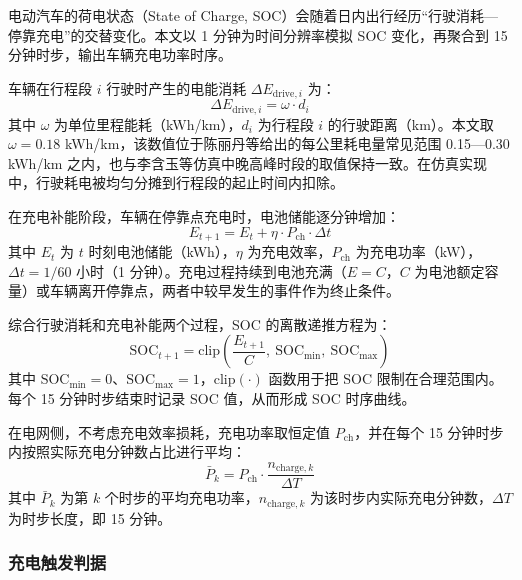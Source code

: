\documentclass[10pt,a4paper]{article}
\numberwithin{equation}{section}
\numberwithin{table}{section}
\numberwithin{figure}{section}
\begin{document}
    电动汽车的荷电状态（State of Charge, SOC）会随着日内出行经历“行驶消耗—停靠充电”的交替变化。本文以 1 分钟为时间分辨率模拟 SOC 变化，再聚合到 15 分钟时步，输出车辆充电功率时序。

    车辆在行程段 $i$ 行驶时产生的电能消耗 $\Delta E_{\text{drive},i}$ 为：
    \begin{equation}
    \label{eq:energy_drive}
    \Delta E_{\text{drive},i} = \omega \cdot d_i
    \end{equation}
    其中 $\omega$ 为单位里程能耗（kWh/km），$d_i$ 为行程段 $i$ 的行驶距离（km）。本文取 $\omega = 0.18$ kWh/km，该数值位于陈丽丹等\supercite{ref9}给出的每公里耗电量常见范围 0.15—0.30 kWh/km 之内，也与李含玉等\supercite{ref10}仿真中晚高峰时段的取值保持一致。在仿真实现中，行驶耗电被均匀分摊到行程段的起止时间内扣除。

    在充电补能阶段，车辆在停靠点充电时，电池储能逐分钟增加：
    \begin{equation}
    \label{eq:energy_charge}
    E_{t+1} = E_t + \eta \cdot P_{\text{ch}} \cdot \Delta t
    \end{equation}
    其中 $E_t$ 为 $t$ 时刻电池储能（kWh），$\eta$ 为充电效率，$P_{\text{ch}}$ 为充电功率（kW），$\Delta t = 1/60$ 小时（1 分钟）。充电过程持续到电池充满（$E = C$，$C$ 为电池额定容量）或车辆离开停靠点，两者中较早发生的事件作为终止条件。

    综合行驶消耗和充电补能两个过程，SOC 的离散递推方程为：
    \begin{equation}
    \label{eq:soc_recursion}
    \text{SOC}_{t+1} = \text{clip}\left(\frac{E_{t+1}}{C},\ \text{SOC}_{\min},\ \text{SOC}_{\max}\right)
    \end{equation}
    其中 $\text{SOC}_{\min} = 0$、$\text{SOC}_{\max} = 1$，$\text{clip}(\cdot)$ 函数用于把 SOC 限制在合理范围内。每个 15 分钟时步结束时记录 SOC 值，从而形成 SOC 时序曲线。

    在电网侧，不考虑充电效率损耗，充电功率取恒定值 $P_{\text{ch}}$，并在每个 15 分钟时步内按照实际充电分钟数占比进行平均：
    \begin{equation}
    \label{eq:avg_power}
    \bar{P}_k = P_{\text{ch}} \cdot \frac{n_{\text{charge},k}}{\Delta T}
    \end{equation}
    其中 $\bar{P}_k$ 为第 $k$ 个时步的平均充电功率，$n_{\text{charge},k}$ 为该时步内实际充电分钟数，$\Delta T$ 为时步长度，即 15 分钟。

    \subsubsection{充电触发判据}
\end{document}
